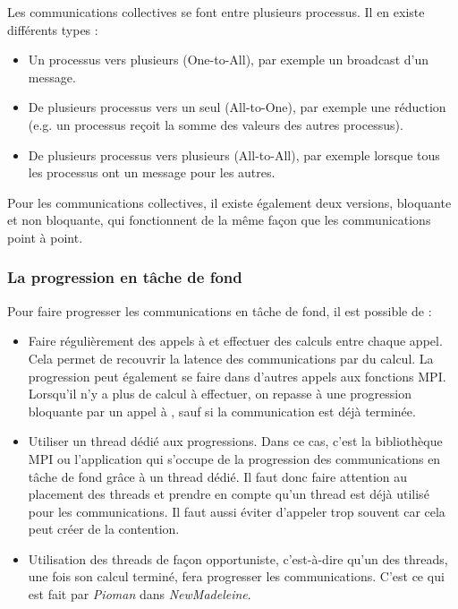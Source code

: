 Les communications collectives se font entre plusieurs processus.
Il en existe différents types :
\begin{itemize}
  \item Un processus vers plusieurs (One-to-All), par exemple un broadcast d'un message.
  \item De plusieurs processus vers un seul (All-to-One), par exemple une réduction (e.g. un processus reçoit la somme des valeurs des autres processus).
  \item De plusieurs processus vers plusieurs (All-to-All), par exemple lorsque tous les processus ont un message pour les autres.
\end{itemize}
Pour les communications collectives, il existe également deux versions, bloquante et non bloquante, qui fonctionnent de la même façon que les communications point à point.

\subsubsection{La progression en tâche de fond}

Pour faire progresser les communications en tâche de fond, il est possible de :

\begin{itemize}
  \item Faire régulièrement des appels à  et effectuer des calculs entre chaque appel.
  Cela permet de recouvrir la latence des communications par du calcul.
  La progression peut également se faire dans d'autres appels aux fonctions MPI.
  Lorsqu'il n'y a plus de calcul à effectuer, on repasse à une progression bloquante par un appel à ,
  sauf si la communication est déjà terminée.
  \item Utiliser un thread dédié aux progressions.
  Dans ce cas, c'est la bibliothèque MPI ou l'application qui s'occupe de la progression des communications
  en tâche de fond grâce à un thread dédié.
  Il faut donc faire attention au placement des threads et prendre en compte qu'un thread est déjà utilisé pour les communications.
  Il faut aussi éviter d'appeler trop souvent  car cela peut créer de la contention.
  \item Utilisation des threads de façon opportuniste, c'est-à-dire qu'un des threads, une fois son calcul terminé, fera progresser les communications.
  C'est ce qui est fait par \emph{Pioman} dans \emph{NewMadeleine}.
\end{itemize}

